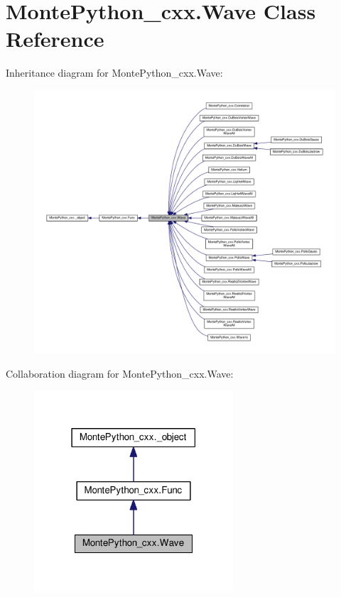 \hypertarget{classMontePython__cxx_1_1Wave}{}\section{Monte\+Python\+\_\+cxx.\+Wave Class Reference}
\label{classMontePython__cxx_1_1Wave}


Inheritance diagram for Monte\+Python\+\_\+cxx.\+Wave\+:
\nopagebreak
\begin{figure}[H]
\begin{center}
\leavevmode
\includegraphics[width=350pt]{classMontePython__cxx_1_1Wave__inherit__graph}
\end{center}
\end{figure}


Collaboration diagram for Monte\+Python\+\_\+cxx.\+Wave\+:
\nopagebreak
\begin{figure}[H]
\begin{center}
\leavevmode
\includegraphics[width=210pt]{classMontePython__cxx_1_1Wave__coll__graph}
\end{center}
\end{figure}
